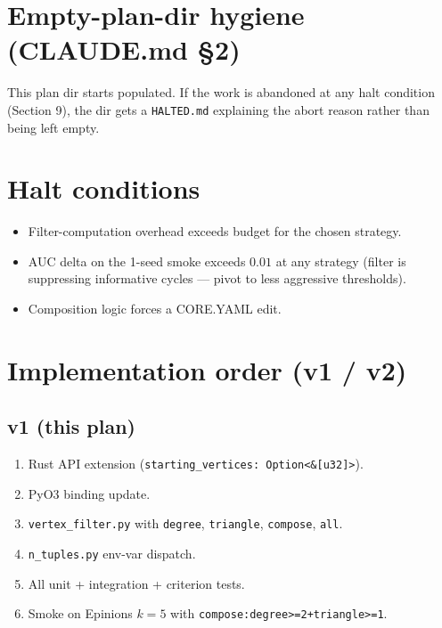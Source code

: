 \documentclass[11pt,a4paper]{article}
\begin{document}
\section{Empty-plan-dir hygiene (CLAUDE.md \S2)}
This plan dir starts populated.  If the work is abandoned at any halt
condition (Section 9), the dir gets a \texttt{HALTED.md} explaining the
abort reason rather than being left empty.

\section{Halt conditions}
\begin{itemize}
\item Filter-computation overhead exceeds budget for the chosen strategy.
\item AUC delta on the 1-seed smoke exceeds $0.01$ at any strategy
  (filter is suppressing informative cycles --- pivot to less
  aggressive thresholds).
\item Composition logic forces a CORE.YAML edit.
\end{itemize}

\section{Implementation order (v1 / v2)}

\subsection*{v1 (this plan)}
\begin{enumerate}
\item Rust API extension (\texttt{starting\_vertices: Option<\&[u32]>}).
\item PyO3 binding update.
\item \texttt{vertex\_filter.py} with \texttt{degree}, \texttt{triangle},
  \texttt{compose}, \texttt{all}.
\item \texttt{n\_tuples.py} env-var dispatch.
\item All unit + integration + criterion tests.
\item Smoke on Epinions $k{=}5$ with \texttt{compose:degree>=2+triangle>=1}.
\end{enumerate}
\end{document}
